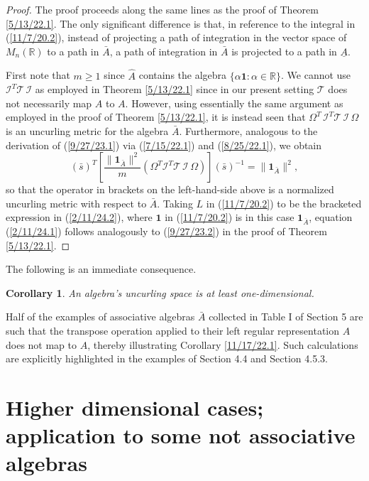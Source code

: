 \documentclass{amsart}
\numberwithin{equation}{section}
\newtheorem{corollary}[theorem]{Corollary}
\theoremstyle{definition}
\numberwithin{theorem}{section}
\begin{document}
 \begin{proof} The proof proceeds along the same lines as the proof of Theorem \ref{5/13/22.1}.  The only significant difference is that, in reference to the integral in (\ref{11/7/20.2}), instead of projecting a path of integration in the vector space of $M_n(\mathbb{R})$ to a path in $\bar{A}$, a path of integration in $\bar{A}$ is projected to a path in $\underline{A}$.
 
First note that $m\ge 1$ since $\hat{A}$ contains the algebra $\{\alpha\mathbf{1}:\alpha\in\mathbb{R}\}$.  We cannot use $\mathcal{I}^T\mathcal{T}\,\mathcal{I}$  as employed in Theorem \ref{5/13/22.1} since in our present setting $\mathcal{T}$ does not necessarily map $A$ to $A$. However, using essentially the same argument as employed in the proof of Theorem \ref{5/13/22.1}, it is instead seen that $\Omega^T\,\mathcal{I}^T\mathcal{T}\,\mathcal{I}\,\Omega$ is an uncurling metric for the algebra $\bar{A}$.  Furthermore, analogous to the derivation of (\ref{9/27/23.1}) via (\ref{7/15/22.1}) and (\ref{8/25/22.1}), we obtain
 \begin{equation}\label{2/11/24.2}
 (\bar{s})^T \left[ \frac{\|\mathbf{1}_{\bar{A}}\|^2}{m} (\Omega^T\mathcal{I}^T\mathcal{T}\,\mathcal{I}\,\Omega)\right](\bar{s})^{-1}
  = \|\mathbf{1}_{\bar{A}}\|^2,\end{equation} so that the operator in brackets on the left-hand-side above is a normalized uncurling metric with respect to $\bar{A}$.  Taking $L$ in (\ref{11/7/20.2}) to be the bracketed expression in (\ref{2/11/24.2}), where $\mathbf{1}$ in (\ref{11/7/20.2}) is in this case $\mathbf{1}_{\bar{A}}$, equation (\ref{2/11/24.1}) follows analogously to (\ref{9/27/23.2}) in the proof of Theorem \ref{5/13/22.1}.
 \end{proof}
 

 The following is an immediate consequence.   
 \begin{corollary}\label{1/1/23.1} An algebra's uncurling space is at least one-dimensional. \end{corollary}
  
Half of the examples of associative algebras $\bar{A}$ collected in Table I of Section 5 are such that the transpose operation applied to their left regular representation $A$ does not map to $A$, thereby illustrating Corollary \ref{11/17/22.1}.  Such calculations are explicitly highlighted in the examples of Section 4.4 and Section 4.5.3.

\section{Higher dimensional cases; application to some not associative algebras}
\end{document}
